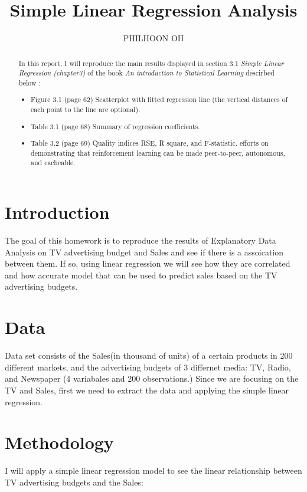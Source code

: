 \documentclass{article}
\title{Simple Linear Regression Analysis}
\author{PHILHOON OH}
\begin{document}

\maketitle

\begin{abstract}
In this report, I will reproduce the main results displayed in section 3.1 \emph{Simple Linear Regression (chapter3)} of the book \emph{An introduction to Statistical Learning} descirbed below : 

\begin{itemize}
\item Figure 3.1 (page 62) Scatterplot with fitted regression line (the vertical distances of each point to the line are optional).  
\item Table 3.1 (page 68) Summary of regression coefficients.  
\item Table 3.2 (page 69) Quality indices RSE, R square, and F-statistic. efforts on demonstrating that reinforcement learning can be made peer-to-peer, autonomous, and cacheable.
\end{itemize}
\end{abstract}

\section{Introduction}
The goal of this homework is to reproduce the results of Explanatory Data Analysis on TV advertising budget and Sales and see if there is a assoication between them. If so, using linear regression we will see how they are correlated and how accurate model that can be used to predict sales based on the TV advertising budgets.


\section{Data}
Data set consists of the Sales(in thousand of units) of a certain products in 200 different markets, and the advertising budgets of 3 differnet media: TV, Radio, and Newspaper (4 variabales and 200 observations.) Since we are focusing on the TV and Sales, first we need to extract the data and applying the simple linear regression.


\section{Methodology}
I will apply a simple linear regression model to see the linear relationship between TV advertising budgets and the Sales:
\end{document}
